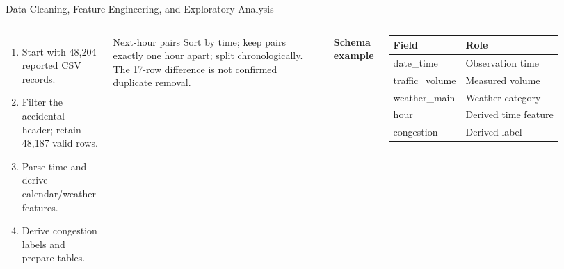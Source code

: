 \documentclass[aspectratio=169,11pt]{beamer}
\begin{document}
\begin{frame}{Data Cleaning, Feature Engineering, and Exploratory Analysis}
\begin{columns}[T,onlytextwidth]
\begin{enumerate}
\item Start with 48,204 reported CSV records.
\item Filter the accidental header; retain 48,187 valid rows.
\item Parse time and derive calendar/weather features.
\item Derive congestion labels and prepare tables.
\end{enumerate}
\begin{block}{Next-hour pairs}
Sort by time; keep pairs exactly one hour apart; split chronologically. The 17-row difference is not confirmed duplicate removal.
\end{block}
\textbf{Schema example}
\begin{tabularx}{\textwidth}{>{\raggedright\arraybackslash}p{} X}
\toprule
\textbf{Field} & \textbf{Role} \\
\midrule
date\_time & Observation time \\
traffic\_volume & Measured volume \\
weather\_main & Weather category \\
hour & Derived time feature \\
congestion & Derived label \\
\bottomrule
\end{tabularx}
\vspace{3mm}
\begin{center}
\end{center}
\end{columns}
\end{frame}
\end{document}
